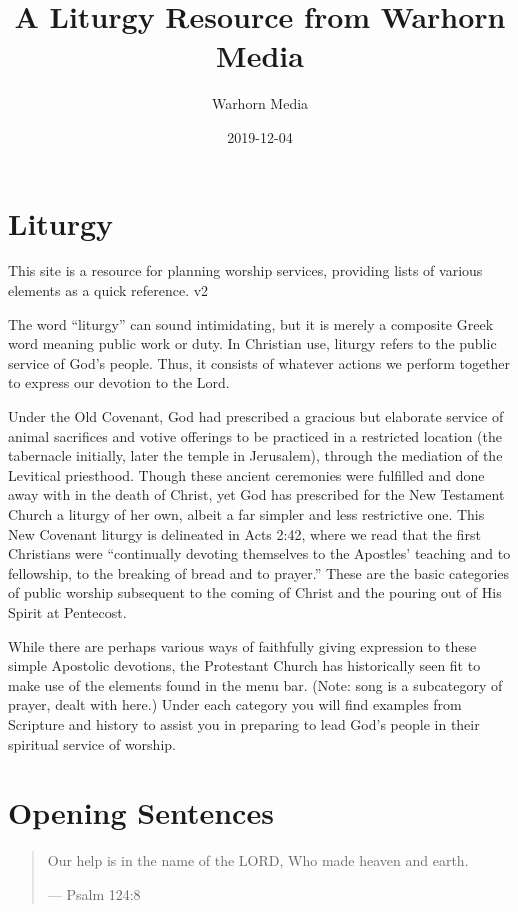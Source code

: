 \documentclass[]{book}
\title{A Liturgy Resource from Warhorn Media}
\author{Warhorn Media}
\date{2019-12-04}
\begin{document}
\maketitle

{
\setcounter{tocdepth}{1}
\tableofcontents
}
\chapter*{Liturgy}\label{liturgy}

This site is a resource for planning worship services, providing lists
of various elements as a quick reference. v2

The word ``liturgy'' can sound intimidating, but it is merely a
composite Greek word meaning public work or duty. In Christian use,
liturgy refers to the public service of God's people. Thus, it consists
of whatever actions we perform together to express our devotion to the
Lord.

Under the Old Covenant, God had prescribed a gracious but elaborate
service of animal sacrifices and votive offerings to be practiced in a
restricted location (the tabernacle initially, later the temple in
Jerusalem), through the mediation of the Levitical priesthood. Though
these ancient ceremonies were fulfilled and done away with in the death
of Christ, yet God has prescribed for the New Testament Church a liturgy
of her own, albeit a far simpler and less restrictive one. This New
Covenant liturgy is delineated in Acts 2:42, where we read that the
first Christians were ``continually devoting themselves to the Apostles'
teaching and to fellowship, to the breaking of bread and to prayer.''
These are the basic categories of public worship subsequent to the
coming of Christ and the pouring out of His Spirit at Pentecost.

While there are perhaps various ways of faithfully giving expression to
these simple Apostolic devotions, the Protestant Church has historically
seen fit to make use of the elements found in the menu bar. (Note: song
is a subcategory of prayer, dealt with here.) Under each category you
will find examples from Scripture and history to assist you in preparing
to lead God's people in their spiritual service of worship.

\chapter{Opening Sentences}\label{opening}

\begin{quote}
Our help is in the name of the LORD, Who made heaven and earth.

--- Psalm 124:8
\end{quote}
\end{document}
